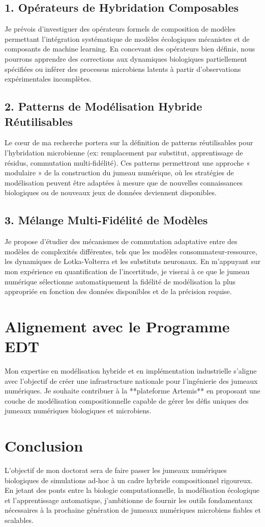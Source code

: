 \documentclass[11pt,a4paper]{article}
\begin{document}
\subsection{1. Opérateurs de Hybridation Composables}
Je prévois d'investiguer des opérateurs formels de composition de modèles permettant l'intégration systématique de modèles écologiques mécanistes et de composants de machine learning. En concevant des opérateurs bien définis, nous pourrons apprendre des corrections aux dynamiques biologiques partiellement spécifiées ou inférer des processus microbiens latents à partir d'observations expérimentales incomplètes.

\subsection{2. Patterns de Modélisation Hybride Réutilisables}
Le cœur de ma recherche portera sur la définition de patterns réutilisables pour l'hybridation microbienne (ex: remplacement par substitut, apprentissage de résidus, commutation multi-fidélité). Ces patterns permettront une approche « modulaire » de la construction du jumeau numérique, où les stratégies de modélisation peuvent être adaptées à mesure que de nouvelles connaissances biologiques ou de nouveaux jeux de données deviennent disponibles.

\subsection{3. Mélange Multi-Fidélité de Modèles}
Je propose d'étudier des mécanismes de commutation adaptative entre des modèles de complexités différentes, tels que les modèles consommateur-ressource, les dynamiques de Lotka-Volterra et les substituts neuronaux. En m'appuyant sur mon expérience en quantification de l'incertitude, je viserai à ce que le jumeau numérique sélectionne automatiquement la fidélité de modélisation la plus appropriée en fonction des données disponibles et de la précision requise.

\section{Alignement avec le Programme EDT}
Mon expertise en modélisation hybride et en implémentation industrielle s'aligne avec l'objectif de créer une infrastructure nationale pour l'ingénierie des jumeaux numériques. Je souhaite contribuer à la **plateforme Artemis** en proposant une couche de modélisation compositionnelle capable de gérer les défis uniques des jumeaux numériques biologiques et microbiens.

\section{Conclusion}
L'objectif de mon doctorat sera de faire passer les jumeaux numériques biologiques de simulations ad-hoc à un cadre hybride compositionnel rigoureux. En jetant des ponts entre la biologie computationnelle, la modélisation écologique et l'apprentissage automatique, j'ambitionne de fournir les outils fondamentaux nécessaires à la prochaine génération de jumeaux numériques microbiens fiables et scalables.
\end{document}
